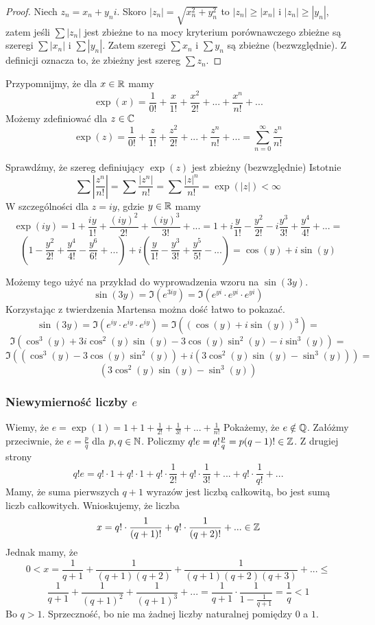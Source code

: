 \documentclass[9pt]{article}
\begin{document}
\begin{proof}
    Niech $z_n = x_n + y_n i$. Skoro $\left|z_n\right| = \sqrt{x_n^2 + y_n^2}$ to
    $\left|z_n\right| \ge \left|x_n\right|$ i $\left|z_n\right| \ge \left|y_n\right|$, zatem
    jeśli $\sum \left|z_n\right|$ jest zbieżne to na mocy kryterium porównawczego zbieżne są szeregi
    $\sum \left|x_n\right|$ i $\sum \left|y_n\right|$. Zatem szeregi $\sum x_n$ i $\sum y_n$ są
    zbieżne (bezwzględnie). Z definicji oznacza to, że zbieżny jest szereg $\sum z_n$.
\end{proof}

Przypomnijmy, że dla $x \in \mathbb{R}$ mamy
\[
    \exp(x) = \frac{1}{0!} + \frac{x}{1!} + \frac{x^2}{2!} + ... + \frac{x^n}{n!} + ...
\]
Możemy zdefiniować dla $z \in \mathbb{C}$
\[
    \exp(z) = \frac{1}{0!} + \frac{z}{1!} + \frac{z^2}{2!} + ... + \frac{z^n}{n!} + ...
    = \sum_{n = 0}^\infty \frac{z^n}{n!}
\]

Sprawdźmy, że szereg definiujący $\exp(z)$ jest zbieżny (bezwzględnie) Istotnie
\[
    \sum\left|\frac{z^n}{n!}\right| = \sum \frac{\left|z^n\right|}{n!}
    = \sum \frac{\left|z\right|^n}{n!} = \exp(|z|) < \infty
\]
W szczególności dla $z = iy$, gdzie $y \in \mathbb{R}$ mamy
\[
    \exp(iy) = 1 + \frac{iy}{1!} + \frac{(iy)^2}{2!} + \frac{(iy)^3}{3!} + ... =
    1 + i \frac{y}{1!} - \frac{y^2}{2!} - i \frac{y^3}{3!} + \frac{y^4}{4!} + ... =
\]
\[
    (1 - \frac{y^2}{2!} + \frac{y^4}{4!} - \frac{y^6}{6!} + ...) +
    i(\frac{y}{1!} - \frac{y^3}{3!} + \frac{y^5}{5!} - ...) =
    \cos (y) + i \sin (y)
\]

Możemy tego użyć na przykład do wyprowadzenia wzoru na $\sin(3y)$.
\[
    \sin(3y) = \Im (e^{3iy}) = \Im (e^{yi} \cdot e^{yi} \cdot e^{yi})
\]
Korzystając z twierdzenia Martensa można dość łatwo to pokazać.
\[
    \sin(3y) = \Im (e^{iy} \cdot e^{iy} \cdot e^{iy}) =
    \Im \left((\cos(y) + i \sin (y))^3\right) =
\]
\[
    \Im \left(\cos^3(y) + 3i\cos^2(y)\sin(y) -3\cos(y) \sin^2(y) - i \sin^3(y)\right) =
\]
\[
    \Im \left((\cos^3(y)-3\cos(y) \sin^2(y)) + i (3\cos^2(y)\sin(y) - \sin^3(y))\right) =
\]
\[
    (3\cos^2(y)\sin(y) - \sin^3(y))
\]

\subsubsection{Niewymierność liczby $e$}

Wiemy, że $e = \exp (1) = 1 + 1 + \frac{1}{2!} + \frac{1}{3!} + ... + \frac{1}{n!}$ Pokażemy, że
$e \notin \mathbb{Q}$. Załóżmy przeciwnie, że $e = \frac{p}{q}$ dla $p, q \in \mathbb{N}$. Policzmy
$q!e = q!\frac{p}{q} = p(q-1)! \in \mathbb{Z}$. Z drugiej strony
\[
    q!e =
    q! \cdot 1 + q! \cdot 1 + q! \cdot \frac{1}{2!} + q! \cdot \frac{1}{3!} + ... +
    q! \cdot \frac{1}{q!} + ...
\]
Mamy, że suma pierwszych $q+1$ wyrazów jest liczbą całkowitą, bo jest sumą liczb całkowitych.
Wnioskujemy, że liczba
\[
    x =
    q! \cdot \frac{1}{(q+1)!} + q! \cdot \frac{1}{(q+2)!} + ...
    \in \mathbb{Z}
\]
Jednak mamy, że
\[
    0 < x = \frac{1}{q+1} + \frac{1}{(q+1)(q+2)} + \frac{1}{(q+1)(q+2)(q+3)} + ... \le
\]
\[
    \frac{1}{q+1} + \frac{1}{(q+1)^2} + \frac{1}{(q+1)^3} + ...
    = \frac{1}{q+1} \cdot \frac{1}{1-\frac{1}{q+1}} = \frac{1}{q} < 1
\]
Bo $q > 1$. Sprzeczność, bo nie ma żadnej liczby naturalnej pomiędzy $0$ a $1$.
\end{document}
